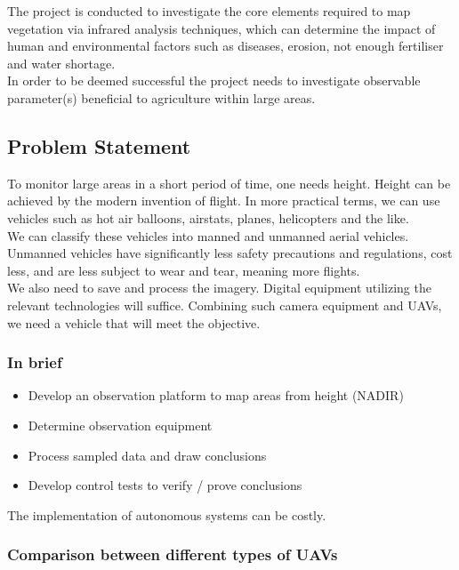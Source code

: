 The project is conducted to investigate the core elements required to map vegetation via infrared analysis techniques, which can determine the impact of human and environmental factors such as diseases, erosion, not enough fertiliser and water shortage.\\

\noindent
In order to be deemed successful the project needs to investigate observable parameter(s) beneficial to agriculture within large areas.

\subsection{Problem Statement}

To monitor large areas in a short period of time, one needs height. Height can be achieved by the modern invention of flight. In more practical terms, we can use vehicles such as hot air balloons, airstats, planes, helicopters and the like.\\

\noindent
We can classify these vehicles into manned and unmanned aerial vehicles. Unmanned vehicles have significantly less safety precautions and regulations, cost less, and are less subject to wear and tear, meaning more flights.\\

\noindent
We also need to save and process the imagery. Digital equipment utilizing the relevant technologies will suffice. Combining such camera equipment and UAVs, we need a vehicle that will meet the objective.

\noindent
\subsubsection{In brief}
\begin{itemize}
    \item Develop an observation platform to map areas from height (NADIR)
    \item Determine observation equipment
    \item Process sampled data and draw conclusions
    \item Develop control tests to verify / prove conclusions
\end{itemize}

\noindent
The implementation of autonomous systems can be costly. 

\subsubsection{Comparison between different types of UAVs}

